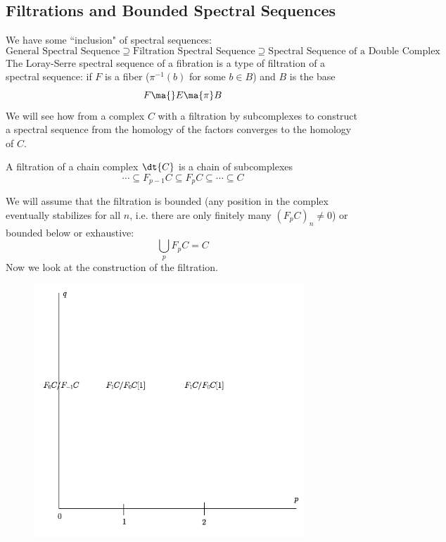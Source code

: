 \subsection{Filtrations and Bounded Spectral Sequences}

We have some ``inclusion" of spectral sequences:
\[
\text{General Spectral Sequence} \supseteq \text{Filtration Spectral Sequence} \supseteq \text{Spectral Sequence of a Double Complex}
\]
The Loray-Serre spectral sequence of a fibration is a type of filtration of a spectral sequence: if $F$ is a fiber ($\pi^{-1}(b)$ for some $b \in B$) and $B$ is the base
\[
F \ma{} E \ma{\pi} B
\]
We will see how from a complex $C$ with a filtration by subcomplexes to construct a spectral sequence from the homology of the factors converges to the homology of $C$. 

\begin{dfn}[Filtration]
A filtration of a chain complex $\dt{C}$ is a chain of subcomplexes 
\[
\cdots \subseteq F_{p-1}C \subseteq F_pC \subseteq \cdots \subseteq C
\]
\end{dfn}

We will assume that the filtration is bounded (any position in the complex eventually stabilizes for all $n$, i.e. there are only finitely many $(F_pC)_n \neq 0$) or bounded below or exhaustive:
\[
\bigcup_p F_pC = C
\]
Now we look at the construction of the filtration. 

\begin{figure}[h] 
   \centering
   \includegraphics[width=4in]{images/grid.png} 
\end{figure}

